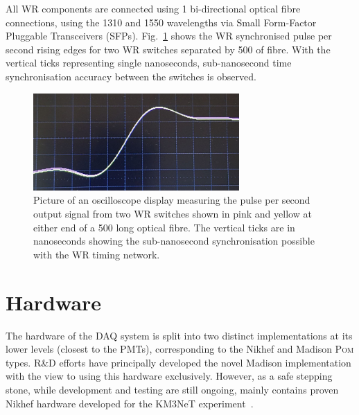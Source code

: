 All WR components are connected using \unit{1}{} bi-directional optical fibre
connections, using the \unit{1310}{} and \unit{1550}{} wavelengths via Small
Form-Factor Pluggable Transceivers (SFPs). Fig.~\ref{fig:sync} shows the WR synchronised pulse per
second rising edges for two \chipsfive WR switches separated by \unit{500}{} of fibre.
With the vertical ticks representing single nanoseconds, sub-nanosecond time synchronisation
accuracy between the switches is observed.

\begin{figure} %
    \includegraphics[width=0.7\textwidth]{diagrams/5-daq/sync.pdf}
    \caption[Picture of White Rabbit timing synchronisation seen within \chipsfive]
    {Picture of an oscilloscope display measuring the pulse per second output signal from two WR
        switches shown in pink and yellow at either end of a \unit{500}{} long optical
        fibre. The vertical ticks are in nanoseconds showing the sub-nanosecond synchronisation
        possible with the WR timing network.}
    \label{fig:sync}
\end{figure}

\section{Hardware} %
\label{sec:daq_hard} %

The hardware of the \chipsfive DAQ system is split into two distinct implementations at its lower
levels (closest to the PMTs), corresponding to the Nikhef and Madison \textsc{Pom} types. \chips
R\&D efforts have principally developed the novel Madison implementation with the view to using
this hardware exclusively. However, as a safe stepping stone, while development and testing are
still ongoing, \chipsfive mainly contains proven Nikhef hardware developed for the KM3NeT
experiment~\cite{adrian2016}.

